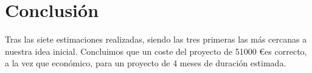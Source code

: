 \section{Conclusión}

Tras las siete estimaciones realizadas, siendo las tres primeras las más cercanas a nuestra idea inicial. Concluimos que un coste del proyecto de 51000 \euro es correcto, a la vez que económico, para un proyecto de 4 meses de duración estimada.



%
%

       

